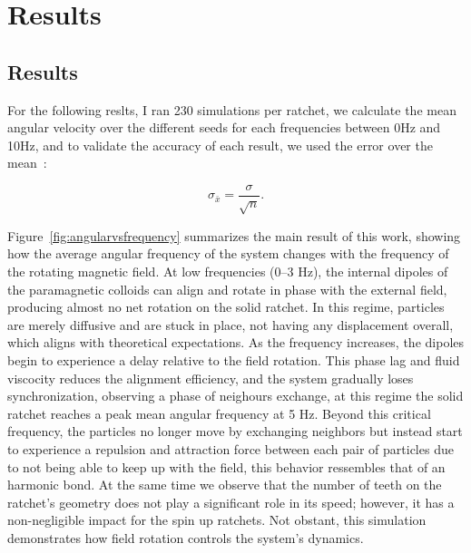 \part{Results}
\label{part:results}

\chapter{Results}

For the following reslts, I ran 230 simulations per ratchet, we calculate the mean angular velocity over the different seeds for each frequencies between 0Hz and 10Hz, and to validate the accuracy of each result, we used the error over the mean~\cite{altman2005standard}:

\begin{equation*}
  \sigma_{\bar{x}} = \displaystyle\frac{\sigma}{\sqrt{n}}.
  \label{eq:errormean}
\end{equation*}

Figure~\ref{fig:angularvsfrequency} summarizes the main result of this work, showing how the average angular frequency of the system changes with the frequency of the rotating magnetic field. At low frequencies (0–3 Hz), the internal dipoles of the paramagnetic colloids can align and rotate in phase with the external field, producing almost no net rotation on the solid ratchet. In this regime, particles are merely diffusive and are stuck in place, not having any displacement overall, which aligns with theoretical expectations.
As the frequency increases, the dipoles begin to experience a delay relative to the field rotation. This phase lag and fluid viscocity reduces the alignment efficiency, and the system gradually loses synchronization, observing a phase of neighours exchange, at this regime the solid ratchet reaches a peak mean angular frequency at 5 Hz. Beyond this critical frequency, the particles no longer move by exchanging neighbors but instead start to experience a repulsion and attraction force between each pair of particles due to not being able to keep up with the field, this behavior ressembles that of an harmonic bond.
At the same time we observe that the number of teeth on the ratchet's geometry does not play a significant role in its speed; however, it has a non-negligible impact for the spin up ratchets.
Not obstant, this simulation demonstrates how field rotation controls the system's dynamics. 

